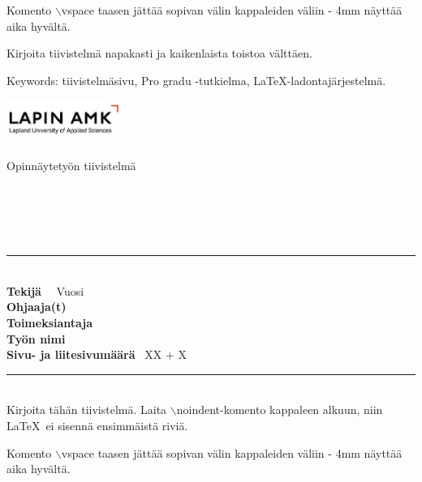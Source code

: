 \vspace{7mm}\noindent Komento $\backslash$vspace taasen jättää sopivan välin kappaleiden väliin - 4mm näyttää aika hyvältä.

\vspace{7mm}\noindent Kirjoita tiivistelmä napakasti ja kaikenlaista toistoa välttäen.

\vspace{7mm}\noindent Keywords: tiivistelmäsivu, Pro gradu -tutkielma, \LaTeX-ladontajärjestelmä.



\newpage\null
\pagestyle{empty}  %

\begin{minipage}{0.4\textwidth}
\includegraphics[width=3.7cm]{ylatunnisteLogo}
\end{minipage}
\begin{minipage}{0.6\textwidth}\raggedleft
Opinnäytetyön tiivistelmä\\
\end{minipage}\

\indent\KoulutusFin \\
\indent\tutkintonimikeFin \\
\rule{\textwidth}{.1mm}\\

\noindent \textbf{Tekijä} \	\tekija\
\noindent Vuosi \	\aika \\
\noindent \textbf{Ohjaaja(t)}	\ \Ohjaajat \\
\noindent \textbf{Toimeksiantaja}	\ \Toimeksiantaja \\
\noindent \textbf{Työn nimi} \	\opinnaytetyo \\
\noindent \textbf{Sivu- ja liitesivumäärä} \	XX + X \\
\noindent\rule{\textwidth}{.1mm}\\



\noindent Kirjoita tähän tiivistelmä. Laita $\backslash${noindent}-komento kappaleen
alkuun, niin \LaTeX\, ei sisennä ensimmäistä riviä.

\vspace{7mm}\noindent Komento $\backslash$vspace taasen jättää sopivan välin kappaleiden väliin - 4mm näyttää aika hyvältä.


